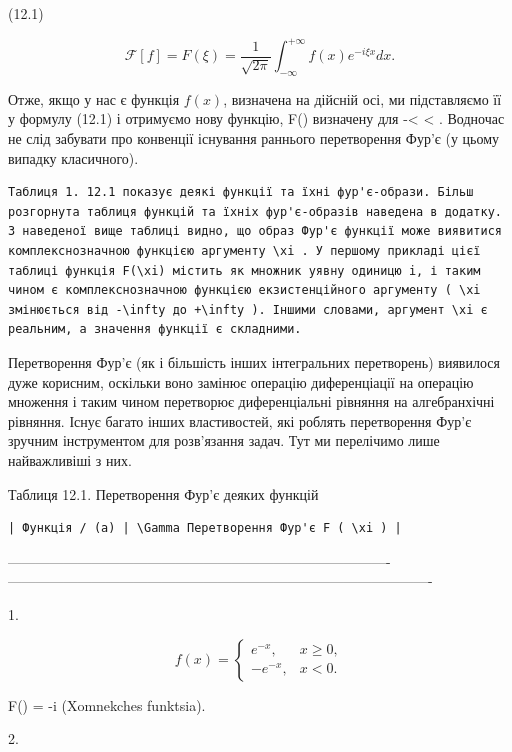 \documentclass[
  ukrainian,
]{article}
\begin{document}
(12.1)

\[
\mathcal{F}[f] = F(\xi) = \frac{1}{\sqrt{2\pi}} \int_{-\infty}^{+\infty} f(x) e^{-i\xi x} dx.
\]

Отже, якщо у нас є функція \(f(x)\), визначена на дійсній осі, ми
підставляємо її у формулу (12.1) і отримуємо нову функцію, F(\xi)
визначену для -\infty \textless{} \xi \textless{} \infty . Водночас не
слід забувати про конвенції існування раннього перетворення Фур'є (у
цьому випадку класичного).

\begin{verbatim}
Таблиця 1. 12.1 показує деякі функції та їхні фур'є-образи. Більш розгорнута таблиця функцій та їхніх фур'є-образів наведена в додатку. З наведеної вище таблиці видно, що образ Фур'є функції може виявитися комплекснозначною функцією аргументу \xi . У першому прикладі цієї таблиці функція F(\xi) містить як множник уявну одиницю i, і таким чином є комплекснозначною функцією екзистенційного аргументу ( \xi змінюється від -\infty до +\infty ). Іншими словами, аргумент \xi є реальним, а значення функції є складними.
\end{verbatim}

Перетворення Фур'є (як і більшість інших інтегральних перетворень)
виявилося дуже корисним, оскільки воно замінює операцію диференціації на
операцію множення і таким чином перетворює диференціальні рівняння на
алгебранхічні рівняння. Існує багато інших властивостей, які роблять
перетворення Фур'є зручним інструментом для розв'язання задач. Тут ми
перелічимо лише найважливіші з них.

Таблиця 12.1. Перетворення Фур'є деяких функцій

\begin{verbatim}
| Функція / (a) | \Gamma Перетворення Фур'є F ( \xi ) |
\end{verbatim}

\textbar----------------------------------------------------------------------------------\textbar-------------------------------------------------------------------------------------------\textbar{}

1.

\[
f(x) = \begin{cases} e^{-x}, & x \ge 0, \\ -e^{-x}, & x < 0. \end{cases}
\]

F(\xi) = -i   (Xomnekches
funktsia). \textbar{}

2.
\end{document}
